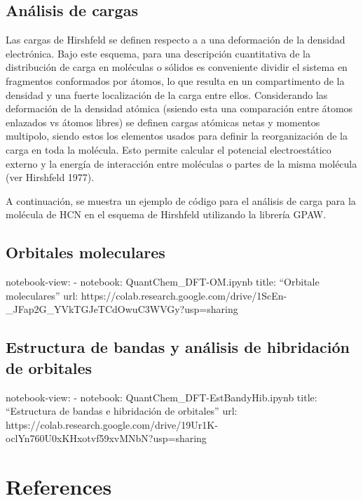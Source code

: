 \documentclass[
  letterpaper,
  DIV=11,
  numbers=noendperiod]{scrreprt}
\begin{document}
\hypertarget{anuxe1lisis-de-cargas}{%
\section{Análisis de cargas}\label{anuxe1lisis-de-cargas}}

Las cargas de Hirshfeld se definen respecto a a una deformación de la
densidad electrónica. Bajo este esquema, para una descripción
cuantitativa de la distribución de carga en moléculas o sólidos es
conveniente dividir el sistema en fragmentos conformados por átomos, lo
que resulta en un compartimento de la densidad y una fuerte localización
de la carga entre ellos. Considerando las deformación de la densidad
atómica (ssiendo esta una comparación entre átomos enlazados vs átomos
libres) se definen cargas atómicas netas y momentos multipolo, siendo
estos los elementos usados para definir la reorganización de la carga en
toda la molécula. Esto permite calcular el potencial electroestático
externo y la energía de interacción entre moléculas o partes de la misma
molécula (ver Hirshfeld 1977).

A continuación, se muestra un ejemplo de código para el análisis de
carga para la molécula de HCN en el esquema de Hirshfeld utilizando la
librería GPAW.

\hypertarget{orbitales-moleculares}{%
\section{Orbitales moleculares}\label{orbitales-moleculares}}

notebook-view: - notebook: QuantChem\_DFT-OM.ipynb title: ``Orbitale
moleculares'' url:
https://colab.research.google.com/drive/1ScEn-\_JFap2G\_YVkTGJeTCdOwuC3WVGy?usp=sharing

\hypertarget{estructura-de-bandas-y-anuxe1lisis-de-hibridaciuxf3n-de-orbitales}{%
\section{Estructura de bandas y análisis de hibridación de
orbitales}\label{estructura-de-bandas-y-anuxe1lisis-de-hibridaciuxf3n-de-orbitales}}

notebook-view: - notebook: QuantChem\_DFT-EstBandyHib.ipynb title:
``Estructura de bandas e hibridación de orbitales'' url:
https://colab.research.google.com/drive/19Ur1K-oclYn760U0xKHxotvf59xvMNbN?usp=sharing


\hypertarget{references}{%
\chapter*{References}\label{references}}
\end{document}
